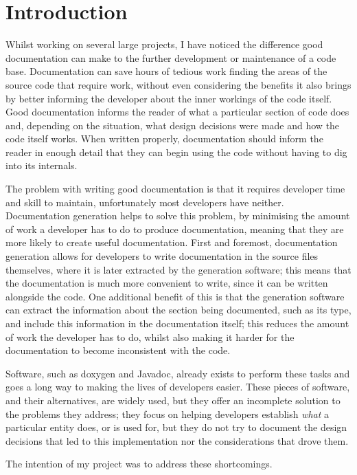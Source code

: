 
\chapter{Introduction}
Whilst working on several large projects, I have noticed the difference good
documentation can make to the further development or maintenance of a code base.
Documentation can save hours of tedious work finding the areas of the source
code that require work, without even considering the benefits it also brings by
better informing the developer about the inner workings of the code itself. Good
documentation informs the reader of what a particular section of code does and,
depending on the situation, what design decisions were made and how the code
itself works. When written properly, documentation should inform the reader in
enough detail that they can begin using the code without having to dig into its
internals.

The problem with writing good documentation is that it requires developer time
and skill to maintain, unfortunately most developers have neither. Documentation
generation helps to solve this problem, by minimising the amount of work a
developer has to do to produce documentation, meaning that they are more likely
to create useful documentation. First and foremost, documentation generation
allows for developers to write documentation in the source files themselves,
where it is later extracted by the generation software; this means that the
documentation is much more convenient to write, since it can be written
alongside the code. One additional benefit of this is that the generation
software can extract the information about the section being documented, such as
its type, and include this information in the documentation itself; this reduces
the amount of work the developer has to do, whilst also making it harder for the
documentation to become inconsistent with the code.

Software, such as doxygen\cite{website:doxygen} and
Javadoc\cite{website:javadoc}, already exists to perform these tasks and goes a
long way to making the lives of developers easier. These pieces of software, and
their alternatives, are widely used, but they offer an incomplete solution to
the problems they address; they focus on helping developers establish
\emph{what} a particular entity does, or is used for, but they do not try to
document the design decisions that led to this implementation nor the
considerations that drove them.

The intention of my project was to address these shortcomings.
